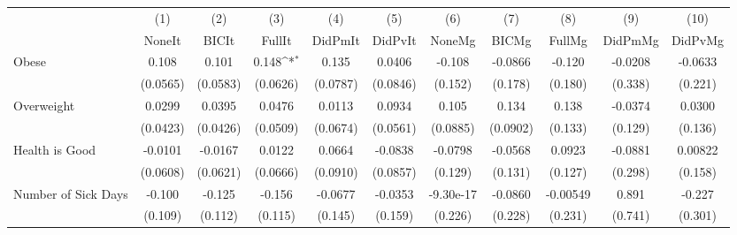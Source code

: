 {
\def\sym#1{\ifmmode^{#1}\else\(^{#1}\)\fi}
\begin{tabular}{l*{10}{c}}
\toprule
            &\multicolumn{1}{c}{(1)}&\multicolumn{1}{c}{(2)}&\multicolumn{1}{c}{(3)}&\multicolumn{1}{c}{(4)}&\multicolumn{1}{c}{(5)}&\multicolumn{1}{c}{(6)}&\multicolumn{1}{c}{(7)}&\multicolumn{1}{c}{(8)}&\multicolumn{1}{c}{(9)}&\multicolumn{1}{c}{(10)}\\
            &\multicolumn{1}{c}{NoneIt}&\multicolumn{1}{c}{BICIt}&\multicolumn{1}{c}{FullIt}&\multicolumn{1}{c}{DidPmIt}&\multicolumn{1}{c}{DidPvIt}&\multicolumn{1}{c}{NoneMg}&\multicolumn{1}{c}{BICMg}&\multicolumn{1}{c}{FullMg}&\multicolumn{1}{c}{DidPmMg}&\multicolumn{1}{c}{DidPvMg}\\
\midrule
Obese       &       0.108         &       0.101         &       0.148\sym{*}  &       0.135         &      0.0406         &      -0.108         &     -0.0866         &      -0.120         &     -0.0208         &     -0.0633         \\
            &    (0.0565)         &    (0.0583)         &    (0.0626)         &    (0.0787)         &    (0.0846)         &     (0.152)         &     (0.178)         &     (0.180)         &     (0.338)         &     (0.221)         \\
\addlinespace
Overweight  &      0.0299         &      0.0395         &      0.0476         &      0.0113         &      0.0934         &       0.105         &       0.134         &       0.138         &     -0.0374         &      0.0300         \\
            &    (0.0423)         &    (0.0426)         &    (0.0509)         &    (0.0674)         &    (0.0561)         &    (0.0885)         &    (0.0902)         &     (0.133)         &     (0.129)         &     (0.136)         \\
\addlinespace
Health is Good&     -0.0101         &     -0.0167         &      0.0122         &      0.0664         &     -0.0838         &     -0.0798         &     -0.0568         &      0.0923         &     -0.0881         &     0.00822         \\
            &    (0.0608)         &    (0.0621)         &    (0.0666)         &    (0.0910)         &    (0.0857)         &     (0.129)         &     (0.131)         &     (0.127)         &     (0.298)         &     (0.158)         \\
\addlinespace
Number of Sick Days&      -0.100         &      -0.125         &      -0.156         &     -0.0677         &     -0.0353         &   -9.30e-17         &     -0.0860         &    -0.00549         &       0.891         &      -0.227         \\
            &     (0.109)         &     (0.112)         &     (0.115)         &     (0.145)         &     (0.159)         &     (0.226)         &     (0.228)         &     (0.231)         &     (0.741)         &     (0.301)         \\
\bottomrule
\end{tabular}
}
